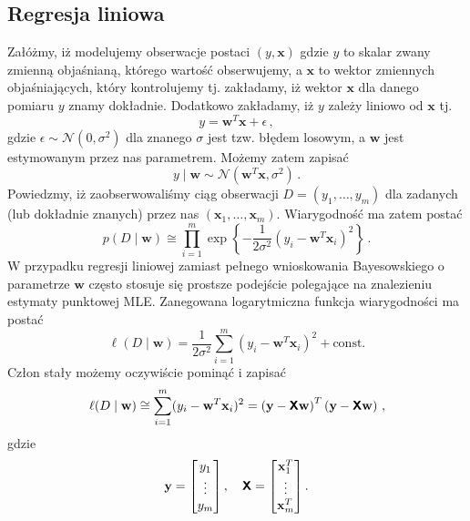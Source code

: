 \documentclass{myclass}
\begin{document}
\subsection{Regresja liniowa}

Załóżmy, iż modelujemy obserwacje postaci \((y,\mathbf{x})\) gdzie \(y\) to skalar zwany zmienną
objaśnianą, którego wartość obserwujemy, a \(\mathbf{x}\) to wektor zmiennych objaśniających, który
kontrolujemy tj. zakładamy, iż wektor \(\mathbf{x}\) dla danego pomiaru \(y\) znamy dokładnie.
Dodatkowo zakładamy, iż \(y\) zależy liniowo od \(\mathbf{x}\) tj.
\begin{equation*}
    y = \mathbf{w}^T\mathbf{x} + \epsilon\,,
\end{equation*}
gdzie \(\epsilon \sim \mathcal{N}(0, \sigma^2)\) dla znanego \(\sigma\) jest tzw. błędem losowym, a
\(\mathbf{w}\) jest estymowanym przez nas parametrem. Możemy zatem zapisać
\begin{equation*}
    y \mid \mathbf{w} \sim \mathcal{N}(\mathbf{w}^T\mathbf{x}, \sigma^2)\,.
\end{equation*}
Powiedzmy, iż zaobserwowaliśmy ciąg obserwacji \(D = (y_1, \ldots, y_m)\) dla zadanych (lub
dokładnie znanych) przez nas \((\mathbf{x}_1,\ldots,\mathbf{x}_m)\). Wiarygodność ma zatem postać
\begin{equation*}
    p(D \mid \mathbf{w}) \cong \prod_{i=1}^m \exp\left\{-\frac{1}{2\sigma^2}\left(y_i - \mathbf{w}^T\mathbf{x}_i\right)^2\right\}\,.
\end{equation*}
W przypadku regresji liniowej zamiast pełnego wnioskowania Bayesowskiego o parametrze \(\mathbf{w}\)
często stosuje się prostsze podejście polegające na znalezieniu estymaty punktowej MLE. Zanegowana
logarytmiczna funkcja wiarygodności ma postać
\begin{equation*}
    \ell(D \mid \mathbf{w}) = \frac{1}{2\sigma^2}\sum_{i=1}^m(y_i - \mathbf{w}^T\mathbf{x}_i)^2 + \text{const.}
\end{equation*}
Człon stały możemy oczywiście pominąć i zapisać
\begin{equation*}
    \ell(D \mid \mathbf{w}) \cong \sum_{i=1}^m(y_i - \mathbf{w}^T\mathbf{x}_i)^2 = \left(\mathbf{y} - \boldsymbol{\mathsf{X}}\mathbf{w}\right)^T\left(\mathbf{y} - \boldsymbol{\mathsf{X}}\mathbf{w}\right)\,,
\end{equation*}
gdzie
\begin{equation*}
    \mathbf{y} = \mqty[y_1 \\ \vdots \\ y_m]\,,\quad \oper{X} = \mqty[\mathbf{x}_1^T \\ \vdots \\ \mathbf{x}_m^T]\,.
\end{equation*}
\end{document}
